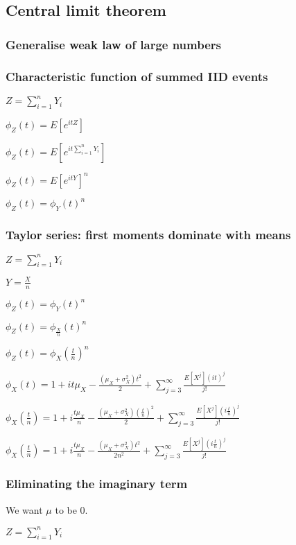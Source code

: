 
\subsection{Central limit theorem}

\subsubsection{Generalise weak law of large numbers}

\subsubsection{Characteristic function of summed IID events}

\(Z=\sum_{i=1}^nY_i\)

\(\phi_Z(t)=E[e^{itZ}]\)

\(\phi_Z(t)=E[e^{it\sum_{i=1}^nY_i}]\)

\(\phi_Z(t)=E[e^{itY}]^n\)

\(\phi_Z(t)=\phi_Y(t)^n\)

\subsubsection{Taylor series: first moments dominate with means}

\(Z=\sum_{i=1}^nY_i\)

\(Y=\frac{X}{n}\)

\(\phi_Z(t)=\phi_Y(t)^n\)

\(\phi_Z(t)=\phi_{\frac{X}{n}}(t)^n\)

\(\phi_Z(t)=\phi_X(\frac{t}{n})^n\)

\(\phi_X(t)=1+it\mu_X -\frac{(\mu_X +\sigma_X^2 )t^2}{2} +\sum_{j=3}^{\infty }\frac{E[X^j](it)^j}{j!}\)

\(\phi_X(\frac{t}{n})=1+i\frac{t\mu_X }{n}-\frac{(\mu_X +\sigma_X^2 )(\frac{t}{n})^2}{2} +\sum_{j=3}^{\infty }\frac{E[X^j](i\frac{t}{n})^j}{j!}\)

\(\phi_X(\frac{t}{n})=1+i\frac{t\mu_X }{n}-\frac{(\mu_X +\sigma_X^2 )t^2}{2n^2} +\sum_{j=3}^{\infty }\frac{E[X^j](i\frac{t}{n})^j}{j!}\)

\subsubsection{Eliminating the imaginary term}

We want \(\mu \) to be \(0\).

\(Z=\sum_{i=1}^nY_i\)

